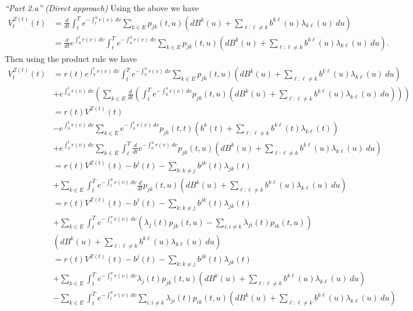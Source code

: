 \documentclass[
]{book}
\begin{document}
\emph{``Part 2.a''} \emph{(Direct approach)} Using the above we have
\begin{align*}
V_t^{Z(t)}(t)&=\frac{d}{dt}\int_t^Te^{-\int_t^ur(v)\ dv}\sum_{k\in E}p_{jk}(t,u)\left(d B^k(u)+\sum_{\ell :\ell \ne k}  b^{k\ell }(u)\lambda_{k\ell }(u)\ du\right)\\
&=\frac{d}{dt}e^{\int_0^tr(v)\ dv}\int_t^Te^{-\int_0^ur(v)\ dv}\sum_{k\in E}p_{jk}(t,u)\left(d B^k(u)+\sum_{\ell :\ell \ne k}  b^{k\ell }(u)\lambda_{k\ell }(u)\ du\right).
\end{align*}
Then using the product rule we have
\begin{align*}
V_t^{Z(t)}(t)&=r(t)e^{\int_0^tr(v)\ dv}\int_t^Te^{-\int_0^ur(v)\ dv}\sum_{k\in E}p_{jk}(t,u)\left(d B^k(u)+\sum_{\ell :\ell \ne k}  b^{k\ell }(u)\lambda_{k\ell }(u)\ du\right)\\
&+e^{\int_0^tr(v)\ dv}\left(\sum_{k\in E}\frac{d}{dt}\left(\int_t^Te^{-\int_0^ur(v)\ dv}p_{jk}(t,u)\left(d B^k(u)+\sum_{\ell :\ell \ne k}  b^{k\ell }(u)\lambda_{k\ell }(u)\ du\right)\right)\right)\\
&=r(t)V^{Z(t)}(t)\\
&-e^{\int_0^tr(v)\ dv}\sum_{k\in E}e^{-\int_0^tr(v)\ dv}p_{jk}(t,t)\left(b^k(t)+\sum_{\ell :\ell \ne k}  b^{k\ell }(t)\lambda_{k\ell }(t)\right)\\
&+e^{\int_0^tr(v)\ dv}\sum_{k\in E}\int_t^T\frac{d}{dt}e^{-\int_0^ur(v)\ dv}p_{jk}(t,u)\left(d B^k(u)+\sum_{\ell :\ell \ne k}  b^{k\ell }(u)\lambda_{k\ell }(u)\ du\right)\\
&=r(t)V^{Z(t)}(t)-b^j(t)-\sum_{k :k \ne j}  b^{jk}(t)\lambda_{jk }(t)\\
&+\sum_{k\in E}\int_t^Te^{-\int_t^ur(v)\ dv}\frac{d}{dt}p_{jk}(t,u)\left(d B^k(u)+\sum_{\ell :\ell \ne k}  b^{k\ell }(u)\lambda_{k\ell }(u)\ du\right)\\
&=r(t)V^{Z(t)}(t)-b^j(t)-\sum_{k :k \ne j}  b^{jk}(t)\lambda_{jk }(t)\\
&+\sum_{k\in E}\int_t^Te^{-\int_t^ur(v)\ dv}\left(\lambda_j(t)p_{jk}(t,u)-\sum_{i:i\ne k}\lambda_{ji}(t)p_{ik}(t,u)\right)\\
&\left(d B^k(u)+\sum_{\ell :\ell \ne k}  b^{k\ell }(u)\lambda_{k\ell }(u)\ du\right)\\
&=r(t)V^{Z(t)}(t)-b^j(t)-\sum_{k :k \ne j}  b^{jk}(t)\lambda_{jk }(t)\\
&+\sum_{k\in E}\int_t^Te^{-\int_t^ur(v)\ dv}\lambda_j(t)p_{jk}(t,u)\left(d B^k(u)+\sum_{\ell :\ell \ne k}  b^{k\ell }(u)\lambda_{k\ell }(u)\ du\right)\\
&-\sum_{k\in E}\int_t^Te^{-\int_t^ur(v)\ dv}\sum_{i:i\ne k}\lambda_{ji}(t)p_{ik}(t,u)\left(d B^k(u)+\sum_{\ell :\ell \ne k}  b^{k\ell }(u)\lambda_{k\ell }(u)\ du\right)
\end{align*}
\end{document}
